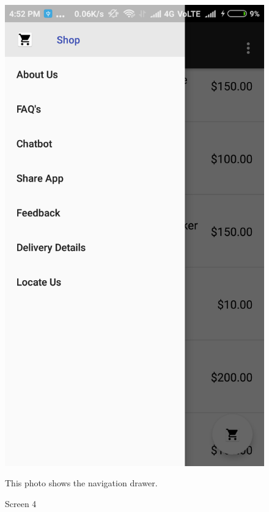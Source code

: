 \begin{figure}[ht]
\centering
\includegraphics[scale=0.30]{images/4.png}
\caption{Screen 4}

This photo shows the navigation drawer.
\end{figure}

\newpage


